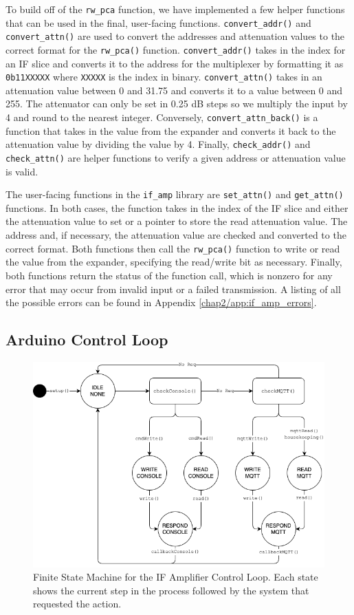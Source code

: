 To build off of the \texttt{rw\_pca} function, we have implemented a few helper functions that can be used in the final, user-facing functions.
\texttt{convert\_addr()} and \texttt{convert\_attn()} are used to convert the addresses and attenuation values to the correct format for the \texttt{rw\_pca()} function.
\texttt{convert\_addr()} takes in the index for an IF slice and converts it to the address for the multiplexer by formatting it as \texttt{0b11XXXXX} where \texttt{XXXXX} is the index in binary.
\texttt{convert\_attn()} takes in an attenuation value between 0 and 31.75 and converts it to a value between 0 and 255.
The attenuator can only be set in 0.25 dB steps so we multiply the input by 4 and round to the nearest integer.
Conversely, \texttt{convert\_attn\_back()} is a function that takes in the value from the expander and converts it back to the attenuation value by dividing the value by 4.
Finally, \texttt{check\_addr()} and \texttt{check\_attn()} are helper functions to verify a given address or attenuation value is valid.

The user-facing functions in the \texttt{if\_amp} library are \texttt{set\_attn()} and \texttt{get\_attn()} functions.
In both cases, the function takes in the index of the IF slice and either the attenuation value to set or a pointer to store the read attenuation value.
The address and, if necessary, the attenuation value are checked and converted to the correct format.
Both functions then call the \texttt{rw\_pca()} function to write or read the value from the expander, specifying the read/write bit as necessary.
Finally, both functions return the status of the function call, which is nonzero for any error that may occur from invalid input or a failed transmission.
A listing of all the possible errors can be found in Appendix \ref{chap2/app:if_amp_errors}.

\subsection{Arduino Control Loop}
\begin{figure}
    \centering
    \includegraphics[width=.8\textwidth]{figs/2/FSM_IF.png}
    \caption[Finite State Machine for the IF Amplifier Control Loop]{Finite State Machine for the IF Amplifier Control Loop. Each state shows the current step in the process followed by the system that requested the action.}
    \label{chap2/fig:if_amp_fsm}
\end{figure}

